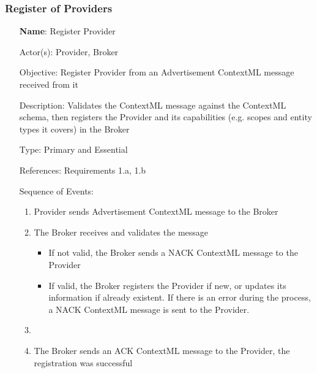\subsubsection{Register of Providers}
\begin{itemize}
	\item[\textbf{Name}:] Register Provider
	\item[Actor(s):] Provider, Broker
	\item[Objective:] Register Provider from an Advertisement ContextML message received from it
	\item[Description:] Validates the ContextML message against the ContextML schema, then registers the Provider and its capabilities (e.g. scopes and entity types it covers) in the Broker 
	\item[Type:] Primary and Essential
	\item[References:] Requirements 1.a, 1.b 
	\item[Sequence of Events:]\hfill
		\begin{enumerate}
			\item Provider sends Advertisement ContextML message to the Broker
			\item The Broker receives and validates the message
				\begin{itemize}
					\item If not valid, the Broker sends a NACK ContextML message to the Provider
					\item If valid, the Broker registers the Provider if new, or updates its information if already existent. If there is an error during the process, a NACK ContextML message is sent to the Provider.
				\end{itemize}
			\item  {}
			\item The Broker sends an ACK ContextML message to the Provider, the registration was successful
		\end{enumerate}
\end{itemize}

